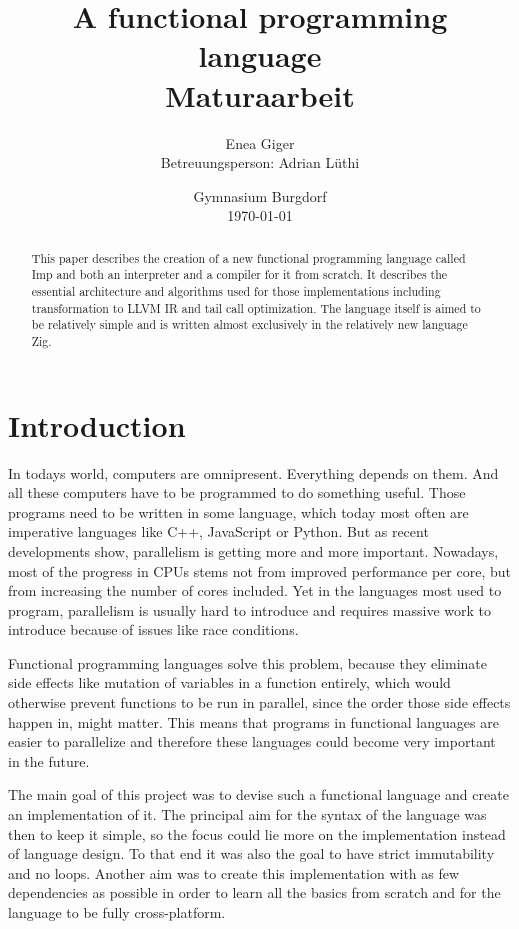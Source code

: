 \documentclass[12pt]{article}
\title{A functional programming language\\Maturaarbeit}
\author{Enea Giger\\Betreuungsperson: Adrian Lüthi}
\date{Gymnasium Burgdorf\\\today}
\begin{document}
\maketitle
\begin{abstract}
	This paper describes the creation of a new functional programming language called Imp
	and both an interpreter and a compiler for it from scratch.
	It describes the essential architecture and algorithms used for those
	implementations including transformation to LLVM IR and tail call optimization.
	The language itself is aimed to be relatively simple
	and is written almost exclusively in the relatively new language
	Zig.
\end{abstract}
\newpage


\tableofcontents
\newpage

\section{Introduction}
In todays world, computers are omnipresent. Everything depends on them.
And all these computers have to be programmed to do something useful.
Those programs need to be written in some language, which today most
often are imperative languages like C++, JavaScript or Python.
But as recent developments show, parallelism is getting more
and more important. Nowadays, most of the progress in CPUs stems not from
improved performance per core, but from increasing the number of cores included.
Yet in the languages most used to program, parallelism is usually hard to introduce
and requires massive work to introduce because of issues like race conditions.

Functional programming languages solve this problem, because they eliminate side effects
like mutation of variables in a function entirely, which would otherwise prevent functions to be run in
parallel, since the order those side effects happen in, might matter.
This means that programs in functional languages are easier to parallelize and therefore
these languages could become very important in the future.

The main goal of this project was to devise such a functional language
and create an implementation of it.
The principal aim for the syntax of the language was then to keep it simple,
so the focus could lie more on the implementation instead of language design.
To that end it was also the goal to have strict immutability and no loops.
Another aim was to create this implementation with as few dependencies as possible
in order to learn all the basics from scratch and for the language to be fully
cross-platform.
\end{document}
